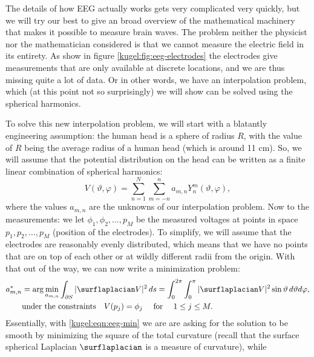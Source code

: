 The details of how EEG actually works gets very complicated very quickly, but we
will try our best to give an broad overview of the mathematical machinery that
makes it possible to measure brain waves. The problem neither the physicist nor
the mathematician considered is that we cannot measure the electric field in its
entirety. As show in figure \ref{kugel:fig:eeg-electrodes} the electrodes give
measurements that are only available at discrete locations, and we are thus
missing quite a lot of data. Or in other words, we have an interpolation
problem, which (at this point not so surprisingly) we will show can be solved
using the spherical harmonics.

To solve this new interpolation problem, we will start with a blatantly
engineering assumption: the human head is a sphere of radius $R$, with the value
of $R$ being the average radius of a human head (which is around 11 cm). So, we
will assume that the potential distribution on the head can be written as a
finite linear combination of spherical harmonics:
\begin{equation*}
  V(\vartheta, \varphi)
    = \sum_{n=1}^N \sum_{m=-n}^n a_{m,n} Y^m_n(\vartheta, \varphi),
\end{equation*}
where the values $a_{m,n}$ are the unknowns of our interpolation problem. Now to
the measurements: we let $\phi_1, \phi_2, \ldots, p_M$ be the measured voltages
at points in space $p_1, p_2, \ldots, p_M$ (position of the electrodes). To
simplify, we will assume that the electrodes are reasonably evenly distributed,
which means that we have no points that are on top of each other or at wildly
different radii from the origin. With that out of the way, we can now write a
minimization problem:
\begin{subequations}
  \begin{align}
    a_{m,n}^* &= \arg \min_{a_{m,n}}
      \int_{\partial S} | \surflaplacian V |^2 \, ds 
      = \int_0^{2\pi} \int_{0}^\pi | \surflaplacian V |^2
        \sin \vartheta \, d\vartheta d\varphi, 
        \label{kugel:eqn:eeg-min} \\
    &\text{under the constraints} \quad V(p_j) = \phi_j
      \quad \text{ for } \quad 1 \leq j \leq M.
      \label{kugel:eqn:eeg-min-constraints}
  \end{align}
\end{subequations}
Essentially, with \eqref{kugel:eqn:eeg-min} we are are asking for the solution
to be smooth by minimizing the square of the total curvature (recall that the
surface spherical Laplacian $\surflaplacian$ is a measure of curvature), while
